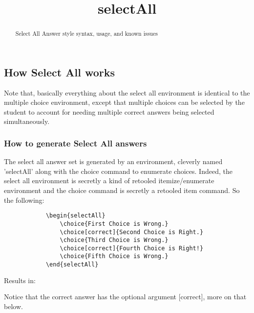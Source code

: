 \documentclass{ximera}
\title{selectAll}
\begin{document}
\begin{abstract}
    Select All Answer style syntax, usage, and known issues 
\end{abstract}
\maketitle


\subsection*{How Select All works}

    Note that, basically everything about the select all environment is identical to the multiple choice environment, except that multiple choices can be selected by the student to account for needing multiple correct answers being selected simultaneously.

    \subsubsection*{How to generate Select All answers}
    
        The select all answer set is generated by an environment, cleverly named 'selectAll' along with the choice command to enumerate choices. Indeed, the select all environment is secretly a kind of retooled itemize/enumerate environment and the choice command is secretly a retooled item command. So the following:
        \begin{verbatim}
            \begin{selectAll}
                \choice{First Choice is Wrong.}
                \choice[correct]{Second Choice is Right.}
                \choice{Third Choice is Wrong.}
                \choice[correct]{Fourth Choice is Right!}
                \choice{Fifth Choice is Wrong.}
            \end{selectAll}
        \end{verbatim}
        Results in:
        \begin{selectAll}
        \end{selectAll}
        
        Notice that the correct answer has the optional argument [correct], more on that below.
        
\end{document}

